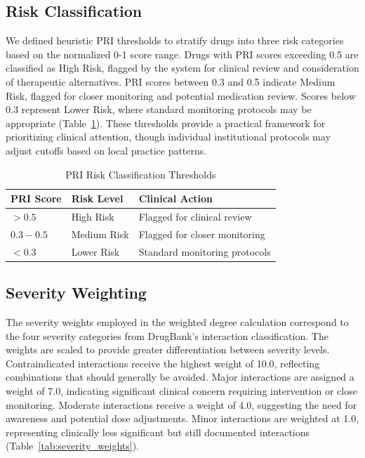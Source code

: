 \documentclass[11pt,a4paper]{article}
\begin{document}
\subsection{Risk Classification}

We defined heuristic PRI thresholds to stratify drugs into three risk categories based on the normalized 0-1 score range. Drugs with PRI scores exceeding 0.5 are classified as High Risk, flagged by the system for clinical review and consideration of therapeutic alternatives. PRI scores between 0.3 and 0.5 indicate Medium Risk, flagged for closer monitoring and potential medication review. Scores below 0.3 represent Lower Risk, where standard monitoring protocols may be appropriate (Table~\ref{tab:pri_thresholds}). These thresholds provide a practical framework for prioritizing clinical attention, though individual institutional protocols may adjust cutoffs based on local practice patterns.

\begin{table}[H]
\centering
\caption{PRI Risk Classification Thresholds}
\label{tab:pri_thresholds}
\begin{tabular}{lll}
\toprule
\textbf{PRI Score} & \textbf{Risk Level} & \textbf{Clinical Action} \\
\midrule
$> 0.5$ & High Risk & Flagged for clinical review \\
$0.3 - 0.5$ & Medium Risk & Flagged for closer monitoring \\
$< 0.3$ & Lower Risk & Standard monitoring protocols \\
\bottomrule
\end{tabular}
\end{table}

\subsection{Severity Weighting}

The severity weights employed in the weighted degree calculation correspond to the four severity categories from DrugBank's interaction classification. The weights are scaled to provide greater differentiation between severity levels. Contraindicated interactions receive the highest weight of 10.0, reflecting combinations that should generally be avoided. Major interactions are assigned a weight of 7.0, indicating significant clinical concern requiring intervention or close monitoring. Moderate interactions receive a weight of 4.0, suggesting the need for awareness and potential dose adjustments. Minor interactions are weighted at 1.0, representing clinically less significant but still documented interactions (Table~\ref{tab:severity_weights}).
\end{document}
